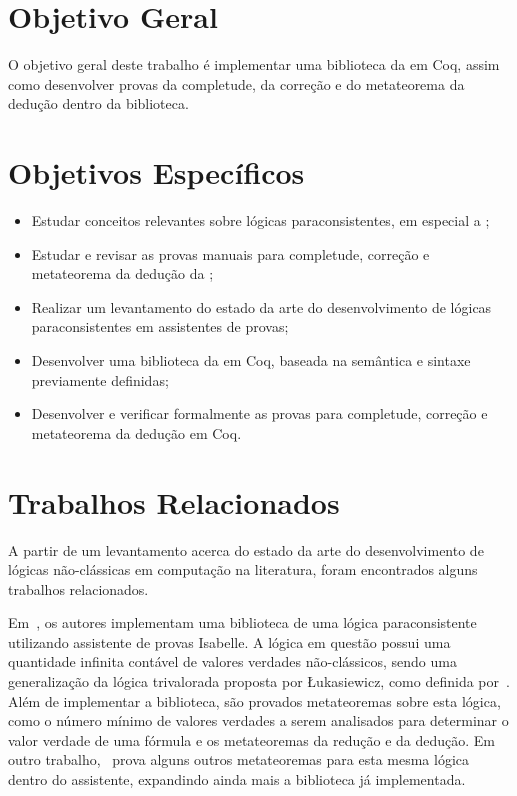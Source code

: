     \section{Objetivo Geral}
        O objetivo geral deste trabalho é implementar uma biblioteca da \lfium{} em Coq, assim como desenvolver provas da completude, da correção e do metateorema da dedução dentro da biblioteca.


    \section{Objetivos Específicos}
        \begin{itemize}
            \item Estudar conceitos relevantes sobre lógicas paraconsistentes, em especial a \lfium{};
            \item Estudar e revisar as provas manuais para completude, correção e metateorema da dedução da \lfium{};
            \item Realizar um levantamento do estado da arte do desenvolvimento de lógicas paraconsistentes em assistentes de provas;
            \item Desenvolver uma biblioteca da \lfium{} em Coq, baseada na semântica e sintaxe previamente definidas;
            \item Desenvolver e verificar formalmente as provas para completude, correção e metateorema da dedução em Coq.
        \end{itemize}


    \section{Trabalhos Relacionados}
        A partir de um levantamento acerca do estado da arte do desenvolvimento de lógicas não-clássicas em computação na literatura, foram encontrados alguns trabalhos relacionados.
    
        Em~\cite{Villadsen2017}, os autores implementam uma biblioteca de uma lógica paraconsistente utilizando assistente de provas Isabelle. A lógica em questão possui uma quantidade infinita contável de valores verdades não-clássicos, sendo uma generalização da lógica trivalorada proposta por {\L}ukasiewicz, como definida por~. Além de implementar a biblioteca, são provados metateoremas sobre esta lógica, como o número mínimo de valores verdades a serem analisados para determinar o valor verdade de uma fórmula e os metateoremas da redução e da dedução. Em outro trabalho,~ prova alguns outros metateoremas para esta mesma lógica dentro do assistente, expandindo ainda mais a biblioteca já implementada.

